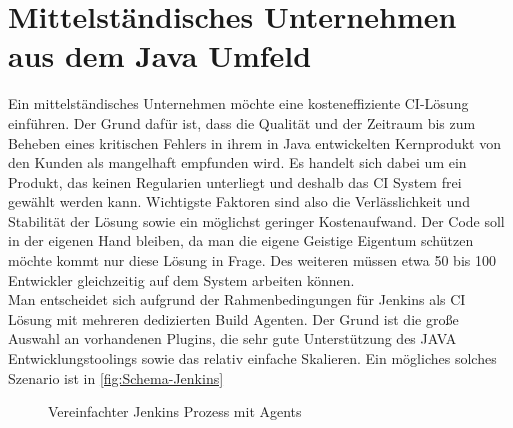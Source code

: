 \section{Mittelständisches Unternehmen aus dem Java Umfeld}
Ein mittelständisches Unternehmen möchte eine kosteneffiziente CI-Lösung einführen. Der Grund dafür ist, dass die Qualität und der Zeitraum bis zum Beheben eines kritischen Fehlers in ihrem in Java entwickelten Kernprodukt von den Kunden als mangelhaft empfunden wird. Es handelt sich dabei um ein Produkt, das keinen Regularien unterliegt und deshalb das CI System frei gewählt werden kann. Wichtigste Faktoren sind also die Verlässlichkeit und Stabilität der Lösung sowie ein möglichst geringer Kostenaufwand. Der Code soll in der eigenen Hand bleiben, da man die eigene Geistige Eigentum schützen möchte kommt nur diese Lösung in Frage. Des weiteren müssen etwa 50 bis 100 Entwickler gleichzeitig auf dem System arbeiten können.\\
Man entscheidet sich aufgrund der Rahmenbedingungen für Jenkins als CI Lösung mit mehreren dedizierten Build Agenten. Der Grund ist die große Auswahl an vorhandenen Plugins, die sehr gute Unterstützung des JAVA Entwicklungstoolings sowie das relativ einfache Skalieren. Ein mögliches solches Szenario ist in \autoref{fig:Schema-Jenkins}
\begin{figure}[H]
  \centering
  \caption{Vereinfachter Jenkins Prozess mit Agents}\label{fig:Schema-Jenkins}
\end{figure}

